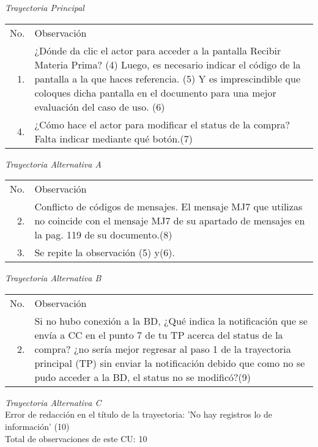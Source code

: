 \documentclass[10pt,spanish]{article}
\providecommand{\tabularnewline}{\\}
\begin{document}


\textit{\large Trayectoria Principal}{\large {} }{\large \par}

\begin{longtable}{rp{8cm}}
No.  & Observación\tabularnewline
1.  & ¿Dónde da clic el actor para acceder a la pantalla Recibir Materia Prima? (4)
Luego, es necesario indicar el código de la pantalla a la que haces referencia. (5) 
Y es imprescindible que coloques dicha pantalla en el documento para una mejor evaluación del caso de uso. (6)\tabularnewline
4.  & ¿Cómo hace el actor para modificar el status de la compra? Falta indicar mediante qué botón.(7)\tabularnewline

\end{longtable}

\textit{Trayectoria Alternativa A}

\begin{longtable}{rp{8cm}}
No.  & Observación\tabularnewline

2.  & Conflicto de códigos de mensajes. El mensaje MJ7 que utilizas no coincide con el mensaje MJ7 de su apartado de mensajes en la pag. 119 de su documento.(8)\tabularnewline
3.  & Se repite la observación (5) y(6).

\end{longtable}

\textit{Trayectoria Alternativa B}

\begin{longtable}{rp{8cm}}
No.  & Observación\tabularnewline

2.  & Si no hubo conexión a la BD, ¿Qué indica la notificación que se envía a CC en el punto 7 de tu TP acerca del status de la compra?  ¿no sería mejor regresar al paso 1 de la trayectoria principal (TP) sin enviar la notificación debido que como no se pudo acceder a la BD, el status no se modificó?(9)

\end{longtable}

{\it Trayectoria Alternativa C}
\\[0.2 cm]
 Error de redacción en el título de la trayectoria: 'No hay registros lo de información' (10)
\\[0.6 cm]
Total de observaciones de este CU: 10


\end{document}
